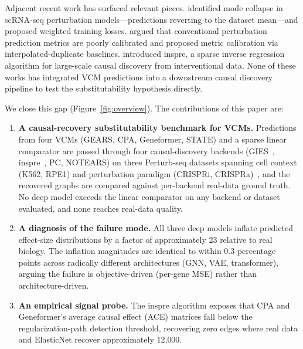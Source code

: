 \documentclass{article}
\theoremstyle{plain}
\theoremstyle{definition}
\theoremstyle{remark}
\begin{document}
Adjacent recent work has surfaced relevant pieces. \citet{mejia2025diversity} identified mode collapse in scRNA-seq perturbation models---predictions reverting to the dataset mean---and proposed weighted training losses. \citet{miller2025calibrated} argued that conventional perturbation prediction metrics are poorly calibrated and proposed metric calibration via interpolated-duplicate baselines. \citet{brown2025inspre} introduced inspre, a sparse inverse regression algorithm for large-scale causal discovery from interventional data. None of these works has integrated VCM predictions into a downstream causal discovery pipeline to test the substitutability hypothesis directly.

We close this gap (Figure~\ref{fig:overview}). The contributions of this paper are:
\begin{enumerate}
\item \textbf{A causal-recovery substitutability benchmark for VCMs.} Predictions from four VCMs (GEARS, CPA, Geneformer, STATE) and a sparse linear comparator are passed through four causal-discovery backends (GIES~\citep{hauser2012gies}, inspre~\citep{brown2025inspre}, PC, NOTEARS) on three Perturb-seq datasets spanning cell context (K562, RPE1) and perturbation paradigm (CRISPRi, CRISPRa)~\citep{replogle2022,norman2019}, and the recovered graphs are compared against per-backend real-data ground truth. No deep model exceeds the linear comparator on any backend or dataset evaluated, and none reaches real-data quality.
\item \textbf{A diagnosis of the failure mode.} All three deep models inflate predicted effect-size distributions by a factor of approximately 23 relative to real biology. The inflation magnitudes are identical to within 0.3 percentage points across radically different architectures (GNN, VAE, transformer), arguing the failure is objective-driven (per-gene MSE) rather than architecture-driven.
\item \textbf{An empirical signal probe.} The inspre algorithm exposes that CPA and Geneformer's average causal effect (ACE) matrices fall below the regularization-path detection threshold, recovering zero edges where real data and ElasticNet recover approximately 12{,}000.

\end{enumerate}
\end{document}
